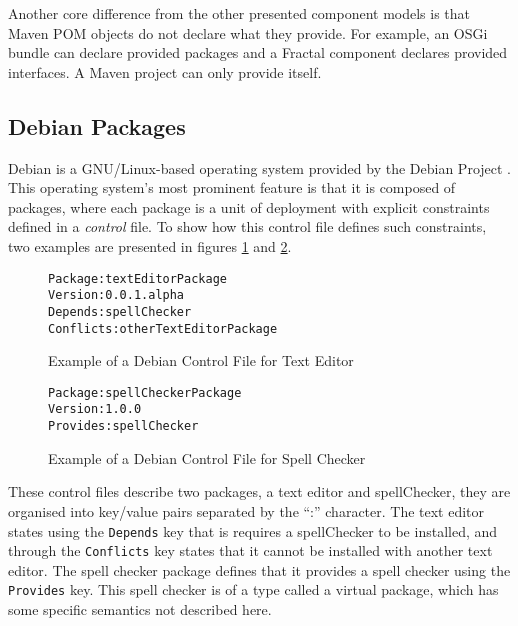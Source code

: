 Another core difference from the other presented component models is that Maven POM objects do not declare what they provide.
For example, an OSGi bundle can declare provided packages and a Fractal component declares provided interfaces.
A Maven project can only provide itself. 

\subsection{Debian Packages}
\label{background.debianPackages}
Debian is a GNU/Linux-based operating system provided by the Debian Project \citep{Barth2005}.
This operating system's most prominent feature is that it is composed of packages, where each package is a unit of deployment with explicit constraints defined in a \textit{control} file.
To show how this control file defines such constraints, two examples are presented in figures \ref{debianmetadatate} and \ref{debianmetadatasc}.

\begin{figure}[htp]
\begin{center}
\begin{alltt}
Package: textEditorPackage
Version: 0.0.1.alpha
Depends: spellChecker
Conflicts: otherTextEditorPackage
\end{alltt}
  \caption[Debian Control file for Text Editor]{Example of a Debian Control File for Text Editor}
  \label{debianmetadatate}
\end{center}
\end{figure}

\begin{figure}[htp]
\begin{center}
\begin{alltt}
Package: spellCheckerPackage
Version: 1.0.0
Provides: spellChecker
\end{alltt}
  \caption{Example of a Debian Control File for Spell Checker}
  \label{debianmetadatasc}
\end{center}
\end{figure}

These control files describe two packages, a text editor and spellChecker, they are organised into key/value pairs separated by the ``:'' character.
The text editor states using the \texttt{Depends} key that is requires a spellChecker to be installed, 
and through the \texttt{Conflicts} key states that it cannot be installed with another text editor.
The spell checker package defines that it provides a spell checker using the \texttt{Provides} key.
This spell checker is of a type called a virtual package, which has some specific semantics not described here.

